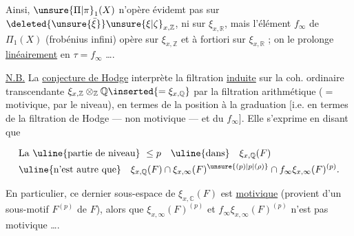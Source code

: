 Ainsi, $\unsure{\Pi|\pi}_1(X)$ n’opère évidemt pas sur $\deleted{\unsure{\bar{\xi}}}\unsure{\xi|\zeta}_{x,\mathbb{Z}}$, ni  sur $\xi_{x,\mathbb{R}}$, mais l’élément $f_\infty$ de $\Pi_1(X)$ (frobénius infini) opère sur $\xi_{x,\mathbb{Z}}$ et à fortiori sur $\xi_{x,\mathbb{R}}$ ; on le prolonge \uline{linéairement} en $\tau=f_\infty$ \ldots.

\uline{N.B.} La \uline{conjecture de Hodge} interprète la filtration \uline{induite} sur la coh. ordinaire transcendante $\xi_{x,\mathbb{Z}}\otimes_{\mathbb{Z}}\mathbb{Q}\inserted{=\xi_{x,\mathbb{Q}}}$ par la filtration arithmétique ($=$ motivique, par le niveau), en termes de la position  à la graduation [i.e. en termes de la filtration de Hodge --- non motivique --- et du $f_\infty$]. Elle s’exprime en disant que


\[
\begin{aligned}
&\text{La \uline{partie de niveau}}\ \leq p\quad\text{\uline{dans}}\quad\xi_{x,\mathbb{Q}}(F)\\
&\text{\uline{n’est autre que}}\quad \xi_{x,\mathbb{Q}}(F)\cap\xi_{x,\infty}(F)^{\unsure{(p)|p|(\rho)}}\cap f_\infty\xi_{x,\infty}(F)^{(p)}.
\end{aligned}
\]

En particulier, ce dernier sous-espace de $\xi_{x,\mathbb{C}}(F)$ est \uline{motivique} (provient d’un  sous-motif $F^{(p)}$ de $F$), alors que $\xi_{x,\infty}(F)^{(p)}$ et $f_\infty\xi_{x,\infty}(F)^{(p)}$ n’est pas motivique \ldots. 

